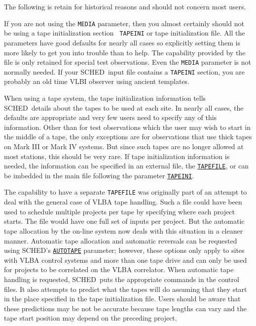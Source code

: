 \documentclass{report}
\newcommand{\sched}{{\sc SCHED}}
\newcommand{\schedb}{{\sc SCHED~}}
\begin{document}
The following is retain for historical reasons and should not concern
most users.

If you are not using the {\tt MEDIA} parameter, then you almost
certainly should not be using a tape initialization section {\tt
TAPEINI} or tape initialization file.  All the parameters have good
defaults for nearly all cases so explicitly setting them is more
likely to get you into trouble than to help.  The capability provided
by the file is only retained for special test observations.  Even the
{\tt MEDIA} parameter is not normally needed.  If your \schedb input
file contains a {\tt TAPEINI} section, you are probably an old time
VLBI observer using ancient templates.

When using a tape system, the tape initialization information tells
\schedb details about the tapes to be used at each site.  In nearly
all cases, the defaults are appropriate and very few users need to
specify any of this information.  Other than for test observations
which the user may wish to start in the middle of a tape, the only
exceptions are for observations that use thick tapes on Mark III or
Mark IV systems.  But since such tapes are no longer allowed at most
stations, this should be very rare.  If tape initialization
information is needed, the information can be specified in an external
file, the 
{\hyperref[MP:TAPEFILE]{{\tt TAPEFILE}}}, or can be imbedded
in the main file following the parameter 
{\hyperref[MP:TAPEINI]{{\tt TAPEINI}}}.

The capability to have a separate {\tt TAPEFILE} was originally part
of an attempt to deal with the general case of VLBA tape handling.
Such a file could have been used to schedule multiple projects per
tape by specifying where each project starts.  The file would have one
full set of inputs per project.  But the automatic tape allocation by
the on-line system now deals with this situation in a cleaner manner.
Automatic tape allocation and automatic reversals can be requested
using \sched's 
{\hyperref[MP:AUTOTAPE]{{\tt AUTOTAPE}}} parameter;
however, these options only apply to sites with VLBA control systems
and more than one tape drive and can only be used for projects to be
correlated on the VLBA correlator.  When automatic tape handling is
requested, \schedb puts the appropriate commands in the control files.
It also attempts to predict what the tapes will do assuming that they
start in the place specified in the tape initialization file.  Users
should be aware that these predictions may be not be accurate because
tape lengths can vary and the tape start position may depend on the
preceding project.
\end{document}
